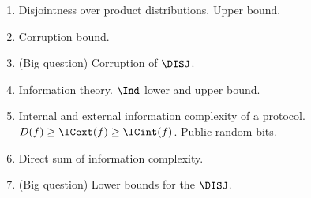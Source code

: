 \begin{enumerate}
    \item Disjointness over product distributions. Upper bound.
    \item Corruption bound.
    \item (Big question) Corruption of $\DISJ$.    
    \item Information theory. $\Ind$ lower and upper bound.
    \item Internal and external information complexity of a protocol. $D(f) \ge \ICext(f) \ge \ICint(f)$.
        Public random bits.
    \item Direct sum of information complexity.
    \item (Big question) Lower bounds for the $\DISJ$.
\end{enumerate}



